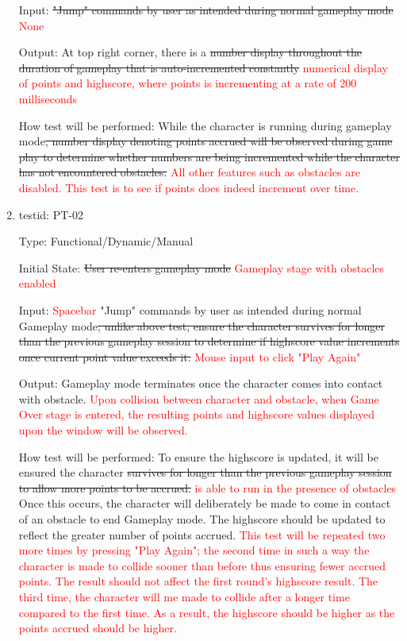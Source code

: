 \documentclass[12pt, titlepage]{article}
\begin{document}
\begin{enumerate}
Input: \sout{"Jump" commands by user as intended during normal gameplay mode} \textcolor{red}{None}
					
Output: At top right corner, there is a \sout{number display throughout the duration of gameplay that is auto-incremented constantly} \textcolor{red}{numerical display of points and highscore, where points is incrementing at a rate of 200 milliseconds}
					
How test will be performed: While the character is running during gameplay mode\sout{, number display denoting points accrued will be observed during game play to determine whether numbers are being incremented while the character has not encountered obstacles.} \textcolor{red}{All other features such as obstacles are disabled. This test is to see if points does indeed increment over time.} \\

\item{testid: PT-02\\}

Type: Functional/Dynamic/Manual
					
Initial State: \sout{User re-enters gameplay mode} \textcolor{red}{Gameplay stage with obstacles enabled}
					
Input: \textcolor{red}{Spacebar} "Jump" commands by user as intended during normal Gameplay mode\sout{; unlike above test, ensure the character survives for longer than the previous gameplay session to determine if highscore value increments once current point value exceeds it.} \textcolor{red}{Mouse input to click "Play Again"} 
					
Output: Gameplay mode terminates once the character comes into contact with obstacle. \textcolor{red}{Upon collision between character and obstacle, when Game Over stage is entered, the resulting points and highscore values displayed upon the window will be observed.}
					
How test will be performed: To ensure the highscore is updated, it will be ensured the character \sout{survives for longer than the previous gameplay session to allow more points to be accrued.} \textcolor{red}{is able to run in the presence of obstacles} Once this occurs, the character will deliberately be made to come in contact of an obstacle to end Gameplay mode. The highscore should be updated to reflect the greater number of points accrued. \textcolor{red}{This test will be repeated two more times by pressing "Play Again"; the second time in such a way the character is made to collide sooner than before thus ensuring fewer accrued points. The result should not affect the first round's highscore result. The third time, the character will me made to collide after a longer time compared to the first time. As a result, the highscore should be higher as the points accrued should be higher.}\\


\end{enumerate}
\end{document}

